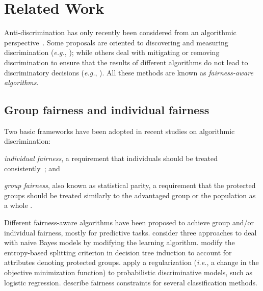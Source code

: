\section{Related Work}\label{sec:related-work}

Anti-discrimination has only recently been considered from an algorithmic perspective~\cite{tuto2016}. Some proposals are oriented to discovering and measuring discrimination ({\em e.g.}, \cite{peder2008,Bonchi2015,angwin_2016_machine}); while others deal with mitigating or removing discrimination to ensure that the results of different algorithms do not lead to discriminatory decisions
({\em e.g.}, \cite{CaldersICDM,HajianFerrer12,hajian2014,Dwork2012,Zemel2013}).
%
All these methods are known as \emph{fairness-aware algorithms}.

\subsection{Group fairness and individual fairness}
Two basic frameworks have been adopted in recent studies on algorithmic discrimination: \begin{inparaenum}[(i)]
	\item \emph{individual fairness}, a requirement that individuals should be treated consistently~\cite{Dwork2012, zliobaite2015survey}; and
	\item \emph{group fairness}, also known as statistical parity, a requirement that the protected groups should be treated similarly to the advantaged group or the population as a whole \cite{peder2008,pederruggi2009}.
\end{inparaenum}

Different fairness-aware algorithms have been proposed to achieve group and/or individual fairness, mostly for predictive tasks. \citet{Calders2010} consider three approaches to deal with naive Bayes models by modifying the learning algorithm.
\citet{CaldersICDM} modify the entropy-based splitting criterion in decision tree induction to account for attributes denoting protected groups.
\citet{Kamishima2012}  apply a regularization ({\em i.e.}, a
change in the objective minimization function) to probabilistic discriminative models, such
as logistic regression. \citet{zafar2015} describe fairness constraints for several classification methods.

